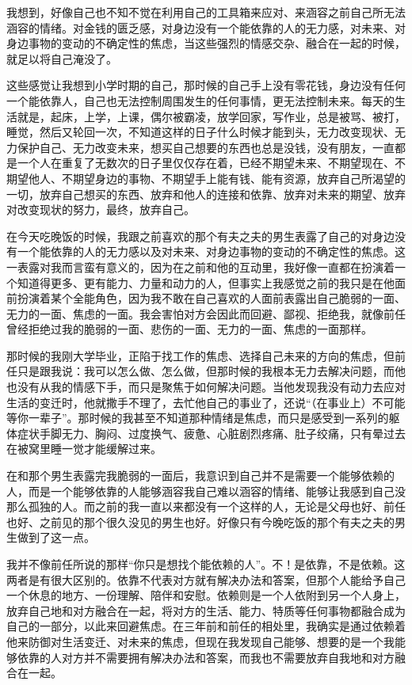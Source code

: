 我想到，好像自己也不知不觉在利用自己的工具箱来应对、来涵容之前自己所无法涵容的情绪。对金钱的匮乏感，对身边没有一个能依靠的人的无力感，对未来、对身边事物的变动的不确定性的焦虑，当这些强烈的情感交杂、融合在一起的时候，就足以将自己淹没了。

这些感觉让我想到小学时期的自己，那时候的自己手上没有零花钱，身边没有任何一个能依靠人，自己也无法控制周围发生的任何事情，更无法控制未来。每天的生活就是，起床，上学，上课，偶尔被霸凌，放学回家，写作业，总是被骂、被打，睡觉，然后又轮回一次，不知道这样的日子什么时候才能到头，无力改变现状、无力保护自己、无力改变未来，想买自己想要的东西也总是没钱，没有朋友，一直都是一个人在重复了无数次的日子里仅仅存在着，已经不期望未来、不期望现在、不期望他人、不期望身边的事物、不期望手上能有钱、能有资源，放弃自己所渴望的一切，放弃自己想买的东西、放弃和他人的连接和依靠、放弃对未来的期望、放弃对改变现状的努力，最终，放弃自己。

在今天吃晚饭的时候，我跟之前喜欢的那个有夫之夫的男生表露了自己的对身边没有一个能依靠的人的无力感以及对未来、对身边事物的变动的不确定性的焦虑。这一表露对我而言蛮有意义的，因为在之前和他的互动里，我好像一直都在扮演着一个知道得更多、更有能力、力量和动力的人，但事实上我感觉之前的我只是在他面前扮演着某个全能角色，因为我不敢在自己喜欢的人面前表露出自己脆弱的一面、无力的一面、焦虑的一面。我会害怕对方会因此而回避、鄙视、拒绝我，就像前任曾经拒绝过我的脆弱的一面、悲伤的一面、无力的一面、焦虑的一面那样。

那时候的我刚大学毕业，正陷于找工作的焦虑、选择自己未来的方向的焦虑，但前任只是跟我说：我可以怎么做、怎么做，但那时候的我根本无力去解决问题，而他也没有从我的情感下手，而只是聚焦于如何解决问题。当他发现我没有动力去应对生活的变迁时，他就撒手不理了，去忙他自己的事业了，还说“（在事业上）不可能等你一辈子”。那时候的我甚至不知道那种情绪是焦虑，而只是感受到一系列的躯体症状\pozhehao{}手脚无力、胸闷、过度换气、疲惫、心脏剧烈疼痛、肚子绞痛，只有晕过去在被窝里睡一觉才能缓解过来。

在和那个男生表露完我脆弱的一面后，我意识到自己并不是需要一个能够依赖的人，而是一个能够依靠的人\pozhehao{}能够涵容我自己难以涵容的情绪、能够让我感到自己没那么孤独的人。而之前的我一直以来都没有一个这样的人，无论是父母也好、前任也好、之前见的那个很久没见的男生也好。好像只有今晚吃饭的那个有夫之夫的男生做到了这一点。

我并不像前任所说的那样“你只是想找个能依赖的人”。不！是依靠，不是依赖。这两者是有很大区别的。依靠不代表对方就有解决办法和答案，但那个人能给予自己一个休息的地方、一份理解、陪伴和安慰。依赖则是一个人依附到另一个人身上，放弃自己地和对方融合在一起，将对方的生活、能力、特质等任何事物都融合成为自己的一部分，以此来回避焦虑。在三年前和前任的相处里，我确实是通过依赖着他来防御对生活变迁、对未来的焦虑，但现在我发现自己能够、想要的是一个我能够依靠的人\pozhehao{}对方并不需要拥有解决办法和答案，而我也不需要放弃自我地和对方融合在一起。


